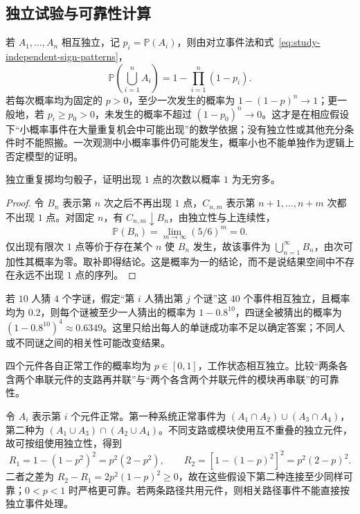 \subsection{独立试验与可靠性计算}
\label{subsec:study-independent-applications}

若 $A_1,\ldots,A_n$ 相互独立，记 $p_i=\mathbb P(A_i)$，则由对立事件法和式~\eqref{eq:study-independent-sign-patterns}，
\begin{equation}
 \mathbb P\!\left(\bigcup_{i=1}^{n}A_i\right)
 =1-\prod_{i=1}^{n}(1-p_i).
 \label{eq:study-independent-at-least-one}
\end{equation}
若每次概率均为固定的 $p>0$，至少一次发生的概率为 $1-(1-p)^n\to1$；更一般地，若 $p_i\ge p_0>0$，未发生的概率不超过 $(1-p_0)^n\to0$。这才是在相应假设下“小概率事件在大量重复机会中可能出现”的数学依据；没有独立性或其他充分条件时不能照搬。一次观测中小概率事件仍可能发生，概率小也不能单独作为逻辑上否定模型的证明。

\begin{example}
\label{ex:study-die-infinitely-often}
独立重复掷均匀骰子，证明出现 $1$ 点的次数以概率 $1$ 为无穷多。
\end{example}

\begin{proof}
令 $B_n$ 表示第 $n$ 次之后不再出现 $1$ 点，$C_{n,m}$ 表示第 $n+1,\ldots,n+m$ 次都不出现 $1$ 点。对固定 $n$，有 $C_{n,m}\downarrow B_n$，由独立性与上连续性，
\[
 \mathbb P(B_n)=\lim_{m\to\infty}(5/6)^m=0.
\]
仅出现有限次 $1$ 点等价于存在某个 $n$ 使 $B_n$ 发生，故该事件为 $\bigcup_{n=1}^{\infty}B_n$，由次可加性其概率为零。取补即得结论。这是概率为一的结论，而不是说结果空间中不存在永远不出现 $1$ 点的序列。
\end{proof}

若 $10$ 人猜 $4$ 个字谜，假定“第 $i$ 人猜出第 $j$ 个谜”这 $40$ 个事件相互独立，且概率均为 $0.2$，则每个谜被至少一人猜出的概率为 $1-0.8^{10}$，四谜全被猜出的概率为 $(1-0.8^{10})^4\approx0.6349$。这里只给出每人的单谜成功率不足以确定答案；不同人或不同谜之间的相关性可能改变结果。

\begin{example}
\label{ex:study-reliability-four-components}
四个元件各自正常工作的概率均为 $p\in[0,1]$，工作状态相互独立。比较“两条各含两个串联元件的支路再并联”与“两个各含两个并联元件的模块再串联”的可靠性。
\end{example}

\begin{solve}
令 $A_i$ 表示第 $i$ 个元件正常。第一种系统正常事件为 $(A_1\cap A_2)\cup(A_3\cap A_4)$，第二种为 $(A_1\cup A_3)\cap(A_2\cup A_4)$。不同支路或模块使用互不重叠的独立元件，故可按组使用独立性，得到
\[
 R_1=1-(1-p^2)^2=p^2(2-p^2),\qquad
 R_2=[1-(1-p)^2]^2=p^2(2-p)^2.
\]
二者之差为 $R_2-R_1=2p^2(1-p)^2\ge0$，故在这些假设下第二种连接至少同样可靠；$0<p<1$ 时严格更可靠。若两条路径共用元件，则相关路径事件不能直接按独立事件处理。
\end{solve}

